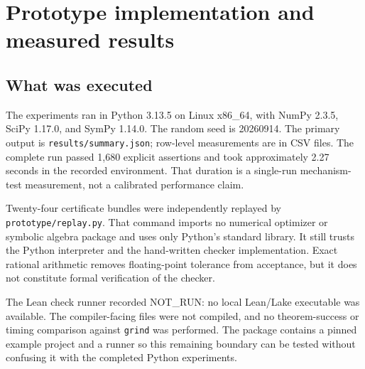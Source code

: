\documentclass[11pt,letterpaper]{article}
\newcommand{\Lean}{\textsf{Lean}}
\newcommand{\grind}{\texttt{grind}}
\newcommand{\status}[1]{\textsf{#1}}
\theoremstyle{definition}
\theoremstyle{remark}
\begin{document}
\section{Prototype implementation and measured results}
\subsection{What was executed}
The experiments ran in Python 3.13.5 on Linux x86\_64, with NumPy 2.3.5, SciPy 1.17.0, and SymPy 1.14.0. The random seed is 20260914. The primary output is \texttt{results/summary.json}; row-level measurements are in CSV files. The complete run passed 1,680 explicit assertions and took approximately 2.27 seconds in the recorded environment. That duration is a single-run mechanism-test measurement, not a calibrated performance claim.

Twenty-four certificate bundles were independently replayed by \texttt{prototype/replay.py}. That command imports no numerical optimizer or symbolic algebra package and uses only Python's standard library. It still trusts the Python interpreter and the hand-written checker implementation. Exact rational arithmetic removes floating-point tolerance from acceptance, but it does not constitute formal verification of the checker.

The \Lean{} check runner recorded \status{NOT\_RUN}: no local \Lean/Lake executable was available. The compiler-facing files were not compiled, and no theorem-success or timing comparison against \grind{} was performed. The package contains a pinned example project and a runner so this remaining boundary can be tested without confusing it with the completed Python experiments.
\end{document}
